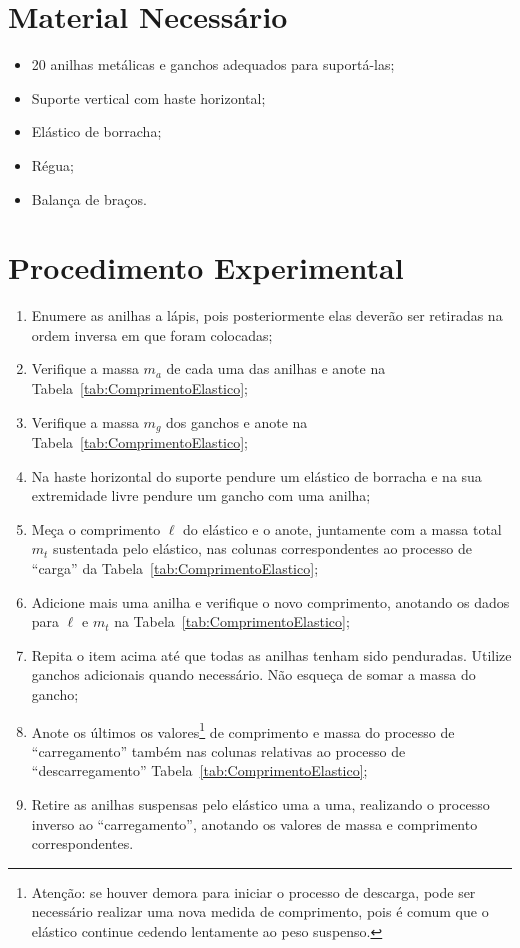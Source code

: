 \section{Material Necessário}

\begin{itemize}
	\item 20 anilhas metálicas e ganchos adequados para suportá-las;
	\item Suporte vertical com haste horizontal;
	\item Elástico de borracha;
	\item Régua;
	\item Balança de braços.
\end{itemize}

\section{Procedimento Experimental}

\begin{enumerate}
    \item Enumere as anilhas a lápis, pois posteriormente elas deverão ser retiradas na ordem inversa em que foram colocadas;
	\item Verifique a massa $m_a$ de cada uma das anilhas e anote na Tabela~\ref{tab:ComprimentoElastico};
	\item Verifique a massa $m_g$ dos ganchos e anote na Tabela~\ref{tab:ComprimentoElastico};
	\item Na haste horizontal do suporte pendure um elástico de borracha e na sua extremidade livre pendure um gancho com uma anilha;
	\item Meça o comprimento $\ell$ do elástico e o anote, juntamente com a massa total $m_t$ sustentada pelo elástico, nas colunas correspondentes ao processo de ``carga'' da Tabela~\ref{tab:ComprimentoElastico};
	\item Adicione mais uma anilha e verifique o novo comprimento, anotando os dados para $\ell$ e $m_t$ na Tabela~\ref{tab:ComprimentoElastico};
	\item Repita o item acima até que todas as anilhas tenham sido penduradas. Utilize ganchos adicionais quando necessário. Não esqueça de somar a massa do gancho;
	\item Anote os últimos os valores\footnote{Atenção: se houver demora para iniciar o processo de descarga, pode ser necessário realizar uma nova medida de comprimento, pois é comum que o elástico continue cedendo lentamente ao peso suspenso.} de comprimento e massa do processo de ``carregamento'' também nas colunas relativas ao processo de ``descarregamento'' Tabela~\ref{tab:ComprimentoElastico};
	\item Retire as anilhas suspensas pelo elástico uma a uma, realizando o processo inverso ao ``carregamento'', anotando os valores de massa e comprimento correspondentes.
\end{enumerate}

